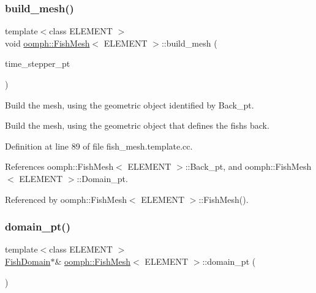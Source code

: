 \subsubsection{\texorpdfstring{build\+\_\+mesh()}{build\_mesh()}}
{\footnotesize\ttfamily template$<$class E\+L\+E\+M\+E\+NT $>$ \\
void \hyperlink{classoomph_1_1FishMesh}{oomph\+::\+Fish\+Mesh}$<$ E\+L\+E\+M\+E\+NT $>$\+::build\+\_\+mesh (\begin{DoxyParamCaption}\item[{Time\+Stepper $\ast$}]{time\+\_\+stepper\+\_\+pt }\end{DoxyParamCaption})\hspace{0.3cm}{\ttfamily [protected]}}



Build the mesh, using the geometric object identified by Back\+\_\+pt. 

Build the mesh, using the geometric object that defines the fish\textquotesingle{}s back. 

Definition at line 89 of file fish\+\_\+mesh.\+template.\+cc.



References oomph\+::\+Fish\+Mesh$<$ E\+L\+E\+M\+E\+N\+T $>$\+::\+Back\+\_\+pt, and oomph\+::\+Fish\+Mesh$<$ E\+L\+E\+M\+E\+N\+T $>$\+::\+Domain\+\_\+pt.



Referenced by oomph\+::\+Fish\+Mesh$<$ E\+L\+E\+M\+E\+N\+T $>$\+::\+Fish\+Mesh().

\mbox{\label{classoomph_1_1FishMesh_ad5076610d83a07e6306375a2632ee460}} 
\subsubsection{\texorpdfstring{domain\+\_\+pt()}{domain\_pt()}}
{\footnotesize\ttfamily template$<$class E\+L\+E\+M\+E\+NT $>$ \\
\hyperlink{classoomph_1_1FishDomain}{Fish\+Domain}$\ast$\& \hyperlink{classoomph_1_1FishMesh}{oomph\+::\+Fish\+Mesh}$<$ E\+L\+E\+M\+E\+NT $>$\+::domain\+\_\+pt (\begin{DoxyParamCaption}{ }\end{DoxyParamCaption})\hspace{0.3cm}{\ttfamily [inline]}}



